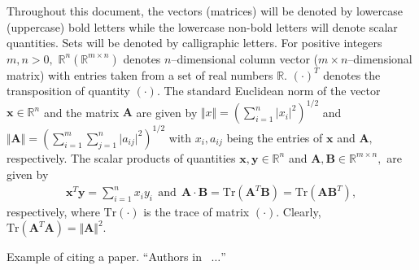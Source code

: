 \documentclass[fontsize=11pt, %
                             paper=letter, %
                             twoside, %
                             captions=tableheading,
                             index=totoc,
                             hyperref]{labbook}
\begin{document}
\begin{addmargin}[0cm]{0cm} %

\pagestyle{scrheadings} %



Throughout this document, the vectors (matrices) will be denoted by lowercase (uppercase) bold letters while the lowercase non-bold letters will denote scalar quantities. Sets will be denoted by calligraphic letters. For positive integers $m,n>0,$ $\mathbb{R}^n(\mathbb{R}^{m\times n})$ denotes $n$--dimensional column vector ($m\times n$--dimensional matrix) with entries taken from a set of real numbers $\mathbb{R}.$ $(\cdot)^T$ denotes the transposition of quantity $(\cdot).$ The standard Euclidean norm of the vector  $\mathbf{x}\in\mathbb{R}^n$ and the matrix $\mathbf{A}$ are given by $\Vert x \Vert = \left(\sum_{i=1}^n\lvert x_i\rvert^2\right)^{1/2}$ and $\Vert \mathbf{A} \Vert = \left(\sum_{i=1}^m\sum_{j=1}^n\lvert a_{ij}\rvert^2\right)^{1/2}$  with $x_i,a_{ij}$ being the entries of $\mathbf{x}$ and $\mathbf{A},$ respectively. The scalar products of quantities $\mathbf{x},
\mathbf{y}\in\mathbb{R}^n$ and $\mathbf{A}, \mathbf{B}\in\mathbb{R}^{m\times n},$ are given by %
%
\begin{align*}
  \mathbf{x}^T\mathbf{y} = \sum_{i=1}^nx_iy_i~~\mathrm{and}~~\mathbf{A}\cdot \mathbf{B} =\mathrm{Tr}\left(\mathbf{A}^T\mathbf{B}\right) = \mathrm{Tr}\left(\mathbf{A}\mathbf{B}^T\right),
\end{align*}
%
respectively, where $\mathrm{Tr}(\cdot)$ is the trace of matrix $(\cdot).$ Clearly, $\mathrm{Tr}(\mathbf{A}^T\mathbf{A}) = \Vert \mathbf{A}\Vert^2.$ %
%

Example of citing a paper. ``Authors in~\cite{Martinelli2015-Robot} $\ldots$''



\end{addmargin}
\end{document}
